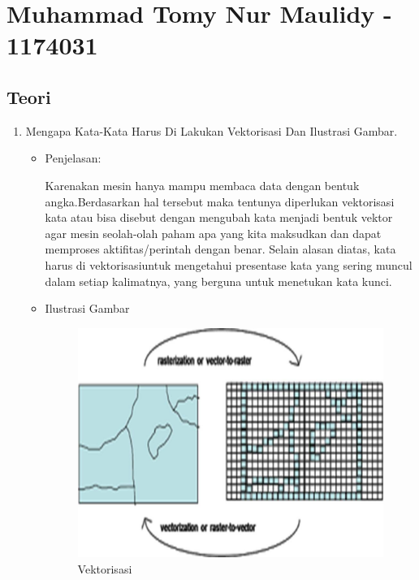 \section{Muhammad Tomy Nur Maulidy - 1174031}
\subsection{Teori}

\begin{enumerate}
\item Mengapa Kata-Kata Harus Di Lakukan Vektorisasi Dan Ilustrasi Gambar.
\begin{itemize}
\item Penjelasan:

Karenakan mesin hanya mampu membaca data dengan bentuk angka.Berdasarkan hal tersebut maka tentunya diperlukan vektorisasi kata atau bisa disebut dengan mengubah kata menjadi bentuk vektor agar mesin seolah-olah paham apa yang kita maksudkan dan dapat memproses aktifitas/perintah dengan benar. Selain alasan diatas, kata harus di vektorisasiuntuk mengetahui presentase kata yang sering muncul dalam setiap kalimatnya, yang berguna untuk menetukan kata kunci.

\item Ilustrasi Gambar

\begin{figure}[!hbtp]
\centering
\includegraphics[scale=0.3]{figures/1174031/5/5.jpg}
\caption{Vektorisasi}
\label{Vektorisasi}
\end{figure}

\end{itemize}


\end{enumerate}
